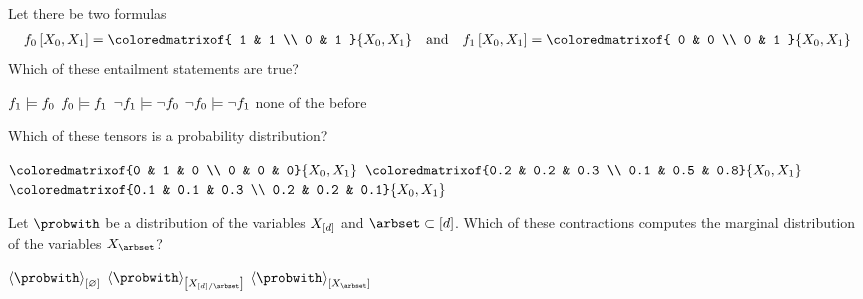 \documentclass[12pt,answers]{exam}
\begin{document}
\begin{questions}
        \question Let there be two formulas
        \begin{align*}
            \formulaofat{0}{\catvariableof{0},\catvariableof{1}}
            =
            \coloredmatrixof{
                1 & 1 \\
                0 & 1
            }{\catvariableof{0},\catvariableof{1}}
            \quad \text{and} \quad
            \formulaofat{1}{\catvariableof{0},\catvariableof{1}}
            =
            \coloredmatrixof{
                0 & 0 \\
                0 & 1
            }{\catvariableof{0},\catvariableof{1}}
        \end{align*}
        Which of these entailment statements are true? \\
        \begin{oneparcheckboxes}
            \correctchoice $f_{1}\models f_{0}$
            \choice $f_{0}\models f_{1}$
            \choice $\lnot f_{1}\models\lnot f_{0}$
            \correctchoice $\lnot f_{0}\models\lnot f_{1}$
            \choice none of the before
        \end{oneparcheckboxes}

        \question Which of these tensors is a probability distribution? \\
        \begin{oneparcheckboxes}
            \correctchoice $\coloredmatrixof{0 & 1 & 0 \\ 0 & 0 & 0}{\catvariableof{0},\catvariableof{1}}$
            \choice $\coloredmatrixof{0.2 & 0.2 & 0.3 \\ 0.1 & 0.5 & 0.8}{\catvariableof{0},\catvariableof{1}}$
            \correctchoice $\coloredmatrixof{0.1 & 0.1 & 0.3 \\ 0.2 & 0.2 & 0.1}{\catvariableof{0},\catvariableof{1}}$
        \end{oneparcheckboxes}

        \question Let $\probwith$ be a distribution of the variables $X_{[d]}$ and $\arbset\subset[\catorder]$.
        Which of these contractions computes the marginal distribution of the variables $\catvariableof{\arbset}$? \\
        \begin{oneparcheckboxes}
            \choice $\contraction{\probwith}$
            \choice $\contractionof{\probwith}{\catvariableof{[\catorder]/\arbset}}$
            \correctchoice $\contractionof{\probwith}{\catvariableof{\arbset}}$
        \end{oneparcheckboxes}


\end{questions}
\end{document}
